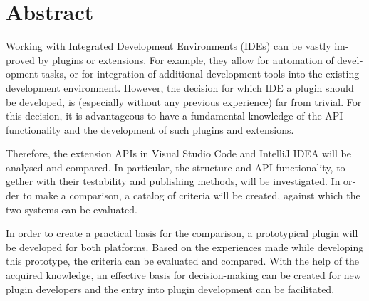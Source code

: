 \chapter*{Abstract}


\begin{english} %

Working with Integrated Development Environments (IDEs) 
can be vastly improved by plugins
or extensions. For example, they allow for automation 
of development tasks, or for integration of additional development
tools into the existing development environment.
However, the decision for which IDE
a plugin should be developed, is (especially without any
previous experience) far from trivial. For this decision,
it is advantageous to have a fundamental knowledge of
the API functionality and the development of such
plugins and extensions.

Therefore, the extension APIs in Visual Studio Code and 
IntelliJ IDEA will be analysed and compared. In particular,
the structure and API functionality, together with
their testability and publishing methods, will be investigated.
In order to make a comparison, a catalog of criteria will be created,
against which the two systems can be evaluated.

In order to create a practical basis for the comparison,
a prototypical plugin will be developed for both platforms.
Based on the experiences made while developing this 
prototype, the criteria can be evaluated and compared.
With the help of the acquired knowledge, an effective
basis for decision-making can be created for
new plugin developers and the entry into plugin development
can be facilitated.

\end{english}
